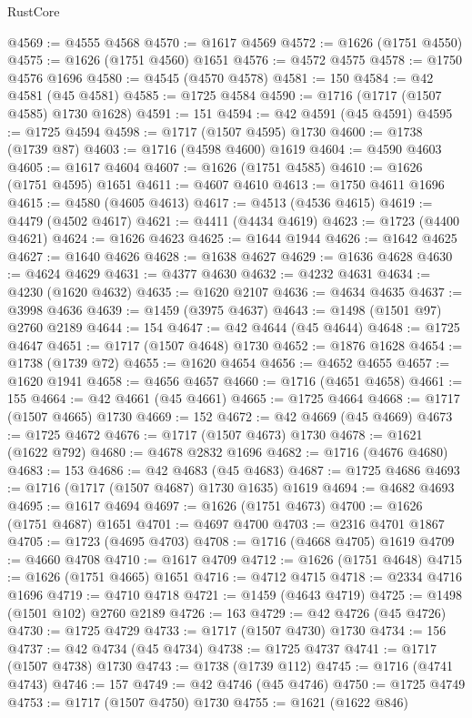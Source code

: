 \begin{lexlean}{RustCore}
\begin{coremodule}
@4569 := @4555 @4568
@4570 := @1617 @4569
@4572 := @1626 (@1751 @4550)
@4575 := @1626 (@1751 @4560) @1651
@4576 := @4572 @4575
@4578 := @1750 @4576 @1696
@4580 := @4545 (@4570 @4578)
@4581 := 150
@4584 := @42 @4581 (@45 @4581)
@4585 := @1725 @4584
@4590 := @1716 (@1717 (@1507 @4585) @1730 @1628)
@4591 := 151
@4594 := @42 @4591 (@45 @4591)
@4595 := @1725 @4594
@4598 := @1717 (@1507 @4595) @1730
@4600 := @1738 (@1739 @87)
@4603 := @1716 (@4598 @4600) @1619
@4604 := @4590 @4603
@4605 := @1617 @4604
@4607 := @1626 (@1751 @4585)
@4610 := @1626 (@1751 @4595) @1651
@4611 := @4607 @4610
@4613 := @1750 @4611 @1696
@4615 := @4580 (@4605 @4613)
@4617 := @4513 (@4536 @4615)
@4619 := @4479 (@4502 @4617)
@4621 := @4411 (@4434 @4619)
@4623 := @1723 (@4400 @4621)
@4624 := @1626 @4623
@4625 := @1644 @1944
@4626 := @1642 @4625
@4627 := @1640 @4626
@4628 := @1638 @4627
@4629 := @1636 @4628
@4630 := @4624 @4629
@4631 := @4377 @4630
@4632 := @4232 @4631
@4634 := @4230 (@1620 @4632)
@4635 := @1620 @2107
@4636 := @4634 @4635
@4637 := @3998 @4636
@4639 := @1459 (@3975 @4637)
@4643 := @1498 (@1501 @97) @2760 @2189
@4644 := 154
@4647 := @42 @4644 (@45 @4644)
@4648 := @1725 @4647
@4651 := @1717 (@1507 @4648) @1730
@4652 := @1876 @1628
@4654 := @1738 (@1739 @72)
@4655 := @1620 @4654
@4656 := @4652 @4655
@4657 := @1620 @1941
@4658 := @4656 @4657
@4660 := @1716 (@4651 @4658)
@4661 := 155
@4664 := @42 @4661 (@45 @4661)
@4665 := @1725 @4664
@4668 := @1717 (@1507 @4665) @1730
@4669 := 152
@4672 := @42 @4669 (@45 @4669)
@4673 := @1725 @4672
@4676 := @1717 (@1507 @4673) @1730
@4678 := @1621 (@1622 @792)
@4680 := @4678 @2832 @1696
@4682 := @1716 (@4676 @4680)
@4683 := 153
@4686 := @42 @4683 (@45 @4683)
@4687 := @1725 @4686
@4693 := @1716 (@1717 (@1507 @4687) @1730 @1635) @1619
@4694 := @4682 @4693
@4695 := @1617 @4694
@4697 := @1626 (@1751 @4673)
@4700 := @1626 (@1751 @4687) @1651
@4701 := @4697 @4700
@4703 := @2316 @4701 @1867
@4705 := @1723 (@4695 @4703)
@4708 := @1716 (@4668 @4705) @1619
@4709 := @4660 @4708
@4710 := @1617 @4709
@4712 := @1626 (@1751 @4648)
@4715 := @1626 (@1751 @4665) @1651
@4716 := @4712 @4715
@4718 := @2334 @4716 @1696
@4719 := @4710 @4718
@4721 := @1459 (@4643 @4719)
@4725 := @1498 (@1501 @102) @2760 @2189
@4726 := 163
@4729 := @42 @4726 (@45 @4726)
@4730 := @1725 @4729
@4733 := @1717 (@1507 @4730) @1730
@4734 := 156
@4737 := @42 @4734 (@45 @4734)
@4738 := @1725 @4737
@4741 := @1717 (@1507 @4738) @1730
@4743 := @1738 (@1739 @112)
@4745 := @1716 (@4741 @4743)
@4746 := 157
@4749 := @42 @4746 (@45 @4746)
@4750 := @1725 @4749
@4753 := @1717 (@1507 @4750) @1730
@4755 := @1621 (@1622 @846)

\end{coremodule}
\end{lexlean}
